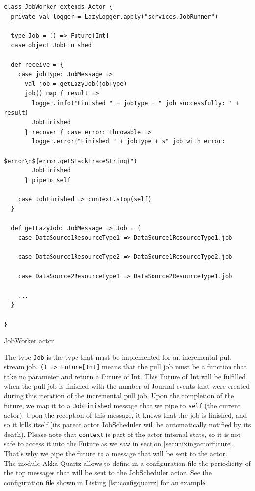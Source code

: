 \begin{listing}[h]
\begin{verbatim}
class JobWorker extends Actor {
  private val logger = LazyLogger.apply("services.JobRunner")
  
  type Job = () => Future[Int]
  case object JobFinished
  
  def receive = {
    case jobType: JobMessage =>
      val job = getLazyJob(jobType)
      job() map { result =>
        logger.info("Finished " + jobType + " job successfully: " + result)
        JobFinished
      } recover { case error: Throwable =>
        logger.error("Finished " + jobType + s" job with error: 
                                  $error\n${error.getStackTraceString}")
        JobFinished
      } pipeTo self
    
    case JobFinished => context.stop(self)
  }

  def getLazyJob: JobMessage => Job = {
    case DataSource1ResourceType1 => DataSource1ResourceType1.job

    case DataSource1ResourceType2 => DataSource1ResourceType2.job

    case DataSource2ResourceType1 => DataSource2ResourceType1.job

    ...
  }
  
}
\end{verbatim}
\caption{JobWorker actor}
\label{lst:akkajobworker}
\end{listing}

The type \verb|Job| is the type that must be implemented for an incremental pull stream job. \verb|() => Future[Int]| means that the pull job must be a function that take no parameter and return a Future of Int. This Future of Int will be fulfilled when the pull job is finished with the number of Journal events that were created during this iteration of the incremental pull job. Upon the completion of the future, we map it to a \verb|JobFinished| message that we pipe to \verb|self| (the current actor). Upon the reception of this message, it knows that the job is finished, and so it kills itself (its parent actor JobScheduler will be automatically notified by its death). Please note that \verb|context| is part of the actor internal state, so it is not safe to access it into the Future as we saw in section 
\ref{sec:mixingactorfuture}. That's why we pipe the future to a message that will be sent to the actor.
\\

The module Akka Quartz allows to define in a configuration file the periodicity of the top messages that will be sent to the JobScheduler actor. See the configuration 
file shown in Listing \ref{lst:configquartz} for an example.

